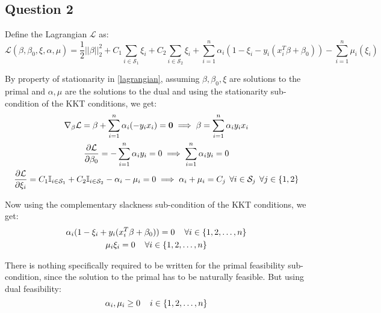 \documentclass{article}
\newcommand{\indi}{\mathbb{I}}
\newcommand{\setS}{\mathcal{S}}
\newcommand{\lagL}{\mathcal{L}}
\begin{document}
\subsection*{Question 2}
\begin{flushleft}
Define the Lagrangian \(\mathcal{L}\) as:
\begin{equation}
\label{lagrangian}
\displaystyle \lagL(\beta, \beta_{0}, \xi, \alpha, \mu) = \frac{1}{2}||\beta||_{2}^{2} + C_{1}\sum_{i \in \setS_{1}}\xi_{i} + C_{2}\sum_{i \in \setS_{2}}\xi_{i} + \sum_{i=1}^{n}\alpha_{i}(1 - \xi_{i} - y_{i}(x_{i}^{T}\beta + \beta_{0})) - \sum_{i=1}^{n}\mu_{i}(\xi_{i})
\end{equation}

By property of stationarity in \ref{lagrangian}, assuming \(\beta, \beta_{0}, \xi\) are solutions to the primal and \(\alpha, \mu\) are the solutions to the dual and using the stationarity sub-condition of the KKT conditions, we get:
\begin{gather}
\label{stationarity-beta}
\displaystyle \nabla_{\beta} \lagL = \beta + \sum_{i=1}^{n}\alpha_{i}(-y_{i}x_{i}) = \mathbf{0} \implies \beta = \sum_{i=1}^{n}\alpha_{i}y_{i}x_{i} \\
\label{stationarity-beta-0}
\displaystyle \frac{\partial \lagL}{\partial \beta_{0}} = -\sum_{i=1}^{n}\alpha_{i}y_{i} = 0 \implies \sum_{i=1}^{n}\alpha_{i}y_{i} = 0 \\
\label{stationarity-xi}
\displaystyle \frac{\partial \lagL}{\partial \xi_{i}} = C_{1}\indi_{i \in \setS_{1}} + C_{2}\indi_{i \in \setS_{2}} - \alpha_{i} - \mu_{i} = 0 \implies \alpha_{i} + \mu_{i} = C_{j} \hspace{1.5mm} \forall i \in \setS_{j} \hspace{1.5mm} \forall j \in \{1, 2\}
\end{gather}

Now using the complementary slackness sub-condition of the KKT conditions, we get:
\begin{gather}
\label{compl-slack-alpha}
\displaystyle \alpha_{i}(1 - \xi_{i} + y_{i}(x_{i}^{T}\beta + \beta_{0})) = 0 \hspace{4mm} \forall i \in \{1, 2, \ldots, n\} \\
\label{compl-slack-mu}
\displaystyle \mu_{i}\xi_{i} = 0 \hspace{4mm} \forall i \in \{1, 2, \ldots, n\}
\end{gather}

There is nothing specifically required to be written for the primal feasibility sub-condition, since the solution to the primal has to be naturally feasible. But using dual feasibility:
\begin{equation}
\label{dual-fease}
\alpha_{i}, \mu_{i} \geq 0 \hspace{4mm} i \in \{1, 2, \ldots, n\}
\end{equation}
\end{flushleft}
\end{document}
